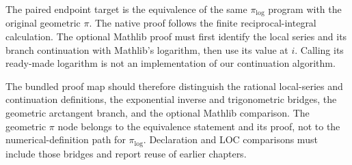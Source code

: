 The paired endpoint target is the equivalence of the same $\pi_{\log}$
program with the original geometric $\pi$. The native proof follows the
finite reciprocal-integral calculation. The optional Mathlib proof must
first identify the local series and its branch continuation with Mathlib's
logarithm, then use its value at $i$. Calling its ready-made logarithm is
not an implementation of our continuation algorithm.

The bundled proof map should therefore distinguish the rational local-series
and continuation definitions, the exponential inverse and trigonometric
bridges, the geometric arctangent branch, and the optional Mathlib comparison.
The geometric $\pi$ node belongs to the equivalence statement and its proof,
not to the numerical-definition path for $\pi_{\log}$. Declaration and LOC
comparisons must include those bridges and report reuse of earlier chapters.
